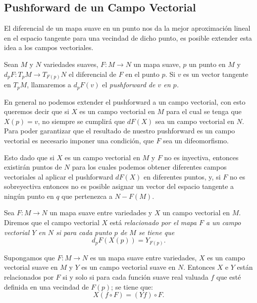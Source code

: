 \subsection{Pushforward de un Campo Vectorial}\label{Subsección: Pushforward de Campos Vectoriales}
El diferencial de un mapa suave en un punto nos da la mejor aproximación lineal en el espacio tangente para una vecindad de dicho punto, es posible extender esta idea a los campos vectoriales.

\begin{definition}[Pushforward]
  Sean $M$ y $N$ variedades suaves, $F: M \to N$ un mapa suave, $p$ un punto en $M$ y $d_pF: T_{p}M \to T_{F(p)}N$ el diferencial de $F$ en el punto $p$. Si $v$ es un vector tangente en $T_p M$, llamaremos a $d_pF(v)$ el \it{pushforward de $v$ en $p$}.
\end{definition}

En general no podemos extender el pushforward a un campo vectorial, con esto queremos decir que si $X$ es un campo vectorial en $M$ para el cual se tenga que $X(p) = v$, no siempre se cumplirá que $dF(X)$ sea un campo vectorial en $N$. Para poder garantizar que el resultado de nuestro pushforward es un campo vectorial es necesario imponer una condición, que $F$ sea un difeomorfismo. 

Esto dado que si $X$ es un campo vectorial en $M$ y $F$ no es inyectiva, entonces existirán puntos de $N$ para los cuales podemos obtener diferentes campos vectoriales al aplicar el pushforward $dF(X)$ en diferentes puntos, y, si $F$ no es sobreyectiva entonces no es posible asignar un vector del espacio tangente a ningún punto en $q$ que pertenezca a $N - F(M)$.

\begin{definition}
	Sea $F: M \to N$ un mapa suave entre variedades y $X$ un campo vectorial en $M$. Diremos que el campo vectorial $X$ está \it{relacionado por el mapa $F$} a un campo vectorial $Y$ en $N$ si para cada punto $p$ de $M$ se tiene que
	\[
		d_pF(X(p)) = Y_{F(p)}.
	\]
\end{definition}

\begin{lemma}
	Supongamos que $F: M \to N$ es un mapa suave entre variedades, $X$ es un campo vectorial suave en $M$ y $Y$ es un campo vectorial suave en $N$. Entonces $X$ e $Y$ están relacionados por $F$ si y solo si para cada función suave real valuada $f$ que esté definida en una vecindad de $F(p)$; se tiene que:
	\[
		X(f \circ F) = (Yf) \circ F.
	\]
\end{lemma}

